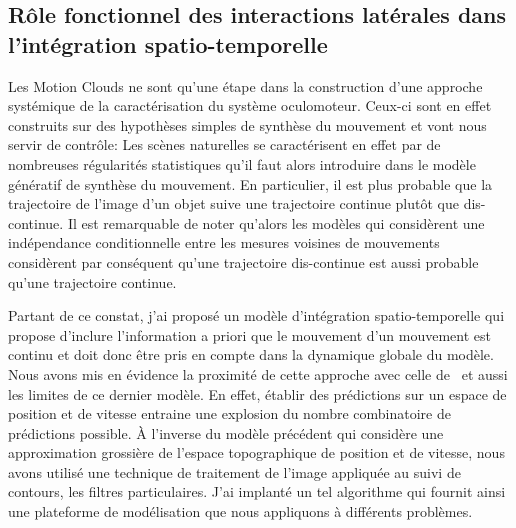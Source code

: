 \documentclass[11pt,french,a4paper,oneside]{article}%
\begin{document}
\subsection{Rôle fonctionnel des interactions latérales dans l'intégration spatio-temporelle~\citep{Perrinet12pred,Khoei13jpp,KhoeiMassonPerrinet17}%
}%
\label{sec:prediction}%
Les Motion Clouds ne sont qu'une étape dans la construction d'une approche systémique de la caractérisation du système oculomoteur. Ceux-ci sont en effet construits sur des hypothèses simples de synthèse du mouvement et vont nous servir de contrôle: Les scènes naturelles se caractérisent en effet par de nombreuses régularités statistiques qu'il faut alors introduire dans le modèle génératif de synthèse du mouvement. En particulier, il est plus probable que la trajectoire de l'image d'un objet suive une trajectoire continue plutôt que dis-continue. Il est remarquable de noter qu'alors les modèles qui considèrent une indépendance conditionnelle entre les mesures voisines de mouvements considèrent par conséquent qu'une trajectoire dis-continue est aussi probable qu'une trajectoire continue.

Partant de ce constat, j'ai proposé un modèle d'intégration spatio-temporelle qui propose d'inclure l'information a priori que le mouvement d'un mouvement est continu et doit donc être pris en compte dans la dynamique globale du modèle. Nous avons mis en évidence la proximité de cette approche avec celle de~\citet{Burgi00} et aussi les limites de ce dernier modèle. En effet, établir des prédictions sur un espace de position et de vitesse entraine une explosion du nombre combinatoire de prédictions possible. À l'inverse du modèle précédent qui considère une approximation grossière de l'espace topographique de position et de vitesse, nous avons utilisé une technique de traitement de l'image appliquée au suivi de contours, les filtres particulaires. J'ai implanté un tel algorithme qui fournit ainsi une plateforme de modélisation que nous appliquons à différents problèmes.
\end{document}
